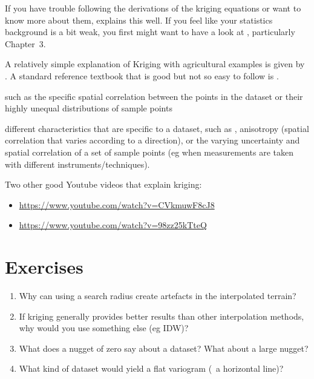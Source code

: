 If you have trouble following the derivations of the kriging equations or want to know more about them, \citet{Lichtenstern13} explains this well.
If you feel like your statistics background is a bit weak, you first might want to have a look at \citet{Fewster14}, particularly Chapter~3.

A relatively simple explanation of Kriging with agricultural examples is given by \citet{Oliver15}.
A standard reference textbook that is good but not so easy to follow is \citet{Wackernagel03}.

such as the specific spatial correlation between the points in the dataset or their highly unequal distributions of sample points


different characteristics that are specific to a dataset, such as , anisotropy (spatial correlation that varies according to a direction), or the varying uncertainty and spatial correlation of a set of sample points (eg when measurements are taken with different instruments/techniques).

Two other good Youtube videos that explain kriging:
\begin{itemize}
\item \url{https://www.youtube.com/watch?v=CVkmuwF8cJ8}
\item \url{https://www.youtube.com/watch?v=98zz25kTteQ}
\end{itemize}

%
\section{Exercises}

\begin{enumerate}
\item Why can using a search radius create artefacts in the interpolated terrain?
\item If kriging generally provides better results than other interpolation methods, why would you use something else (eg IDW)?
\item What does a nugget of zero say about a dataset? What about a large nugget?
\item What kind of dataset would yield a flat variogram (\ie\ a horizontal line)?
\end{enumerate}